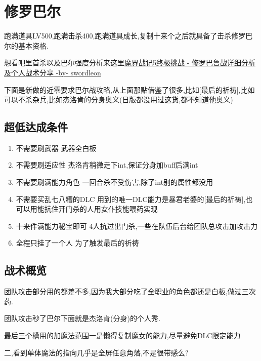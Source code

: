 	\newpage

	\section{修罗巴尔}

	跑满道具LV500,跑满击杀400,跑满道具成长,复制十来个之后就具备了击杀修罗巴尔的基本资格.

	想看吧里首杀以及巴尔强度分析来这里\href{http://tieba.baidu.com/p/3949061316}{魔界战记5终极挑战 - 修罗巴鲁战详细分析及个人战术分享 -by- swordleon }

	下面是新做的近零要求巴尔战攻略,从上面那贴借鉴了很多,比如[最后的祈祷],比如可以不杀杂兵,比如杰洛肯的分身奥义(日版都没用过这货,都不知道他奥义)

	\subsection{超低达成条件}
	\begin{enumerate}
		\item{不需要刷武器}
		武器全白板

		\item{不需要刷适应性}
		杰洛肯稍微走下int,保证分身加buff后满int

		\item{不需要刷满能力角色}
		一回合杀不受伤害,除了int别的属性都没用

		\item{不需要买乱七八糟的DLC}
		用到的唯一DLC能力是暴君老婆的[最后的祈祷],也可以用能抗住开门杀的人用女仆技能喂药实现

		\item{十来件满能力秘宝即可}
		4人抗过出门杀,一些在队伍后台给团队总攻击加攻击力

		\item{全程只挂了一个人}
		为了触发最后的祈祷
	\end{enumerate}

	\subsection{战术概览}

	团队攻击部分用{\color{red}{大魔拳超魔流刷过全职业}}的都差不多,因为我大部分吃了全职业的角色都还是白板,做过三次药.

	团队攻击秒了巴尔下面就是杰洛肯(分身)的个人秀.

	最后三个槽用的加魔法范围一是懒得复制魔女的能力,尽量避免DLC限定能力
	
	二,看到单体魔法的指向几乎是全屏任意角落,不是很带感么?

